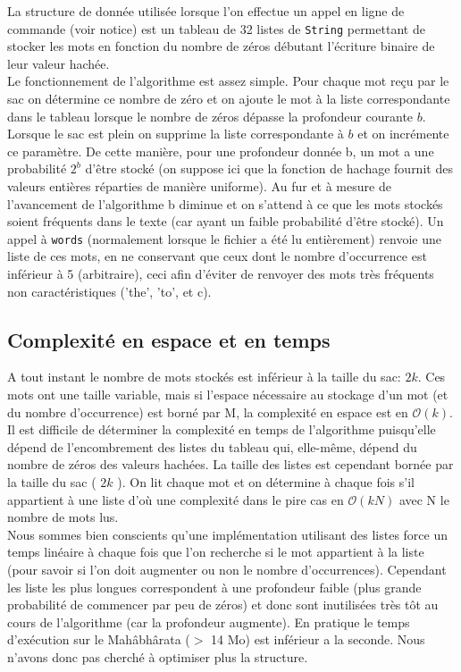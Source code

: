 \documentclass[12pt,a4paper,titlepage]{article}
\newcommand{\class}[1]{\texttt{#1}}
\begin{document}
La structure de donnée utilisée lorsque l'on effectue un appel en ligne de commande (voir notice) est un tableau de 32 listes de \class{String} permettant de stocker les mots en fonction du nombre de zéros débutant l'écriture binaire de leur valeur hachée.\\
Le fonctionnement de l'algorithme est assez simple. Pour chaque mot reçu par le sac on détermine ce nombre de zéro et on ajoute le mot à la liste correspondante dans le tableau lorsque le nombre de zéros dépasse la profondeur courante $b$. Lorsque le sac est plein on supprime la liste correspondante à $b$ et on incrémente ce paramètre. De cette manière, pour une profondeur donnée b, un mot a une probabilité $2^{b}$ d'être stocké (on suppose ici que la fonction de hachage fournit des valeurs entières réparties de manière uniforme). Au fur et à mesure de l'avancement de l'algorithme b diminue et on s'attend à ce que les mots stockés soient fréquents dans le texte (car ayant un faible probabilité d'être stocké). Un appel à \class{words} (normalement lorsque le fichier a été lu entièrement) renvoie une liste de ces mots, en ne conservant que ceux dont le nombre d'occurrence est inférieur à 5 (arbitraire), ceci afin d'éviter de renvoyer des mots très fréquents non caractéristiques ('the', 'to', et c).

\subsection{Complexité en espace et en temps}

A tout instant le nombre de mots stockés est inférieur à la taille du sac: $2k$. Ces mots ont une taille variable, mais si l'espace nécessaire au stockage d'un mot (et du nombre d'occurrence) est borné par M, la complexité en espace est en $\mathcal{O}(k)$.\\

Il est difficile de déterminer la complexité en temps de l'algorithme puisqu'elle dépend de l'encombrement des listes du tableau qui, elle-même, dépend du nombre de zéros des valeurs hachées. La taille des listes est cependant bornée par la taille du sac ( $2k$ ). On lit chaque mot et on détermine à chaque fois s'il appartient à une liste d'où une complexité dans le pire cas en $\mathcal{O}(kN)$ avec N le nombre de mots lus.\\

Nous sommes bien conscients qu'une implémentation utilisant des listes force un temps linéaire à chaque fois que l'on recherche si le mot appartient à la liste (pour savoir si l'on doit augmenter ou non le nombre d'occurrences). Cependant les liste les plus longues correspondent à une profondeur faible (plus grande probabilité de commencer par peu de zéros) et donc sont inutilisées très tôt au cours de l'algorithme (car la profondeur augmente). En pratique le temps d'exécution sur le Mahâbhârata ($>$ 14 Mo) est inférieur a la seconde. Nous n'avons donc pas cherché à optimiser plus la structure.
\end{document}
